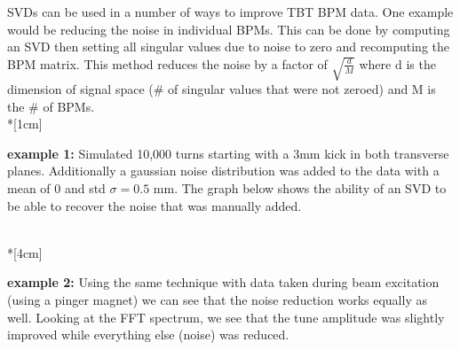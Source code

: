 \documentclass{article}
\begin{document}
\Large{SVDs can be used in a number of ways to improve TBT BPM data. One example would be reducing the noise in individual BPMs. This can be done by computing an SVD then setting all singular values due to noise to zero and recomputing the BPM matrix. This method reduces the noise by a factor of $\sqrt{\frac{d}{M}}$ where d is the dimension of signal space (\# of singular values that were not zeroed) and M is the \# of BPMs. \\*[1cm]

\large{\textbf{example 1:}} Simulated 10,000 turns starting with a 3mm kick in both transverse planes. Additionally a gaussian noise distribution was added to the data with a mean of 0 and std $\sigma = 0.5$ mm. The graph below shows the ability of an SVD to be able to recover the noise that was manually added.

\begin{figure}[H]
\centering
{}
\caption{}
\end{figure}

\textcolor{white}{l} \\*[4cm]

\large{\textbf{example 2:}} Using the same technique with data taken during beam excitation (using a pinger magnet) we can see that the noise reduction works equally as well. Looking at the FFT spectrum, we see that the tune amplitude was slightly improved while everything else (noise) was reduced.

}
\end{document}
